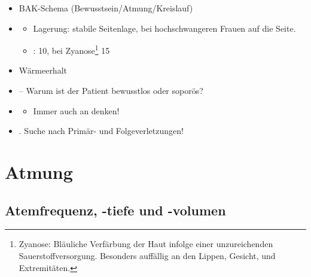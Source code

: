 {
\begin{itemize}
  \item BAK-Schema  (Bewusstsein/Atmung/Kreislauf)
  \item \TxMassVitBes
  \begin{itemize}
    \item Lagerung: stabile Seitenlage, bei hochschwangeren Frauen auf die
     Seite.
    \item {}:  10\LMin , bei
    Zyanose\footnote{Zyanose: Bläuliche Verfärbung der Haut infolge einer unzureichenden
    Sauerstoffversorgung. Besonders auffällig an den Lippen, Gesicht, und
    Extremitäten.}  15\LMin
  \end{itemize}
  \item Wärmeerhalt
  \item {} -- Warum ist der Patient bewusstlos oder
  soporös?
  \item {}
  \begin{itemize}
    \item Immer auch an  denken!
  \end{itemize}
  \item {}. Suche nach Primär- und
  Folgeverletzungen!
\end{itemize}
}





\clearpage
\section{Atmung}

\subsection{Atemfrequenz, -tiefe und -volumen}
\label{topic:atemvolumina}



